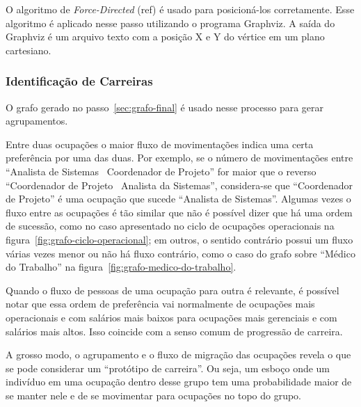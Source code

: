 \documentclass[12pt,a4paper,final]{article}
\begin{document}
O algoritmo de \textit{Force-Directed} (ref) é usado para posicioná-los corretamente. Esse algoritmo é aplicado nesse passo utilizando o programa Graphviz. A saída do Graphviz é um arquivo texto com a posição X e Y do vértice em um plano cartesiano.

\subsubsection{Identificação de Carreiras}



O grafo gerado no passo~\ref{sec:grafo-final} é usado nesse processo para gerar agrupamentos.

Entre duas ocupações o maior fluxo de movimentações indica uma certa preferência por uma das duas. Por exemplo, se o número de movimentações entre \enquote{Analista de Sistemas \textrightarrow~Coordenador de Projeto} for maior que o reverso \enquote{Coordenador de Projeto \textrightarrow~Analista da Sistemas}, considera-se que \enquote{Coordenador de Projeto} é uma ocupação que sucede \enquote{Analista de Sistemas}. Algumas vezes o fluxo entre as ocupações é tão similar que não é possível dizer que há uma ordem de sucessão, como no caso apresentado no ciclo de ocupações operacionais na figura~\ref{fig:grafo-ciclo-operacional}; em outros, o sentido contrário possui um fluxo várias vezes menor ou não há fluxo contrário, como o caso do grafo sobre \enquote{Médico do Trabalho} na figura~\ref{fig:grafo-medico-do-trabalho}.


Quando o fluxo de pessoas de uma ocupação para outra é relevante, é possível notar que essa ordem de preferência vai normalmente de ocupações mais operacionais e com salários mais baixos para ocupações mais gerenciais e com salários mais altos. Isso coincide com a senso comum de progressão de carreira.

A grosso modo, o agrupamento e o fluxo de migração das ocupações revela o que se pode considerar um \enquote{protótipo de carreira}. Ou seja, um esboço onde um indivíduo em uma ocupação dentro desse grupo tem uma probabilidade maior de se manter nele e de se movimentar para ocupações no topo do grupo.
\end{document}
